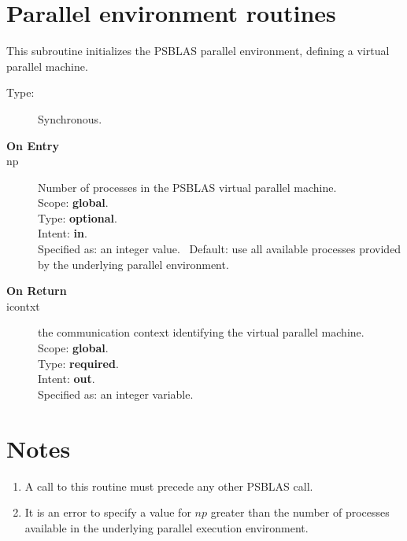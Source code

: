 
\section{Parallel environment routines}
\label{sec:parenv}



This subroutine initializes the PSBLAS parallel environment, defining
a virtual parallel machine.
\begin{description}
\item[Type:] Synchronous.
\item[\bf  On Entry ]
\item[np] Number of processes in the PSBLAS virtual parallel machine.\\
Scope: {\bf global}.\\
Type: {\bf optional}.\\
Intent: {\bf in}.\\
Specified as: an integer value. \
Default: use all available processes provided by the underlying
parallel environment.
\end{description}

\begin{description}
\item[\bf On Return]
\item[icontxt] the communication context identifying the virtual
  parallel machine.\\
Scope: {\bf global}.\\
Type: {\bf required}.\\
Intent: {\bf out}.\\
Specified as: an integer variable.
\end{description}


\section*{Notes}
\begin{enumerate}
\item A call to this routine must precede any other PSBLAS call. 
\item It is an error to specify a value for $np$ greater than the
  number of processes available in the underlying parallel execution
  environment. 
\end{enumerate}



